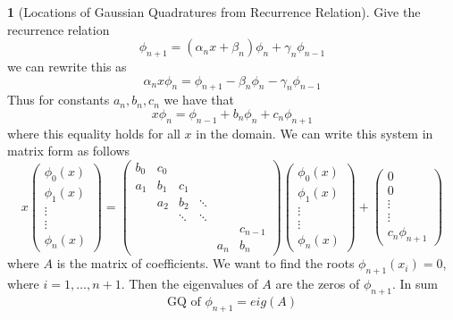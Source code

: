 \documentclass[12pt]{article}
\theoremstyle{definition}
\newtheorem{theorem}{\color{ForestGreen}{\textbf{Theorem}}}
\theoremstyle{definition}
\begin{document}
\begin{theorem}[Locations of Gaussian Quadratures from Recurrence Relation]
Give the recurrence relation 
\begin{equation}
	\phi_{n+1} = (\alpha_n x + \beta_n)\phi_n + \gamma_n \phi_{n-1}
\end{equation}
we can rewrite this as
\begin{equation}
	\alpha_n x \phi_n = \phi_{n+1} - \beta_n \phi_n - \gamma_n \phi_{n-1}
\end{equation}
Thus for constants $a_n,b_n,c_n$ we have that
\begin{equation}
	x \phi_n = \phi_{n-1} +  b_n \phi_n + c_n \phi_{n+1}
\end{equation}
where this equality holds for all $x$ in the domain. We can write this system in matrix form as follows
\begin{equation}
	x
	\begin{pmatrix}
	\phi_0(x) \\ \phi_1(x) \\ \vdots \\ \vdots \\ \phi_n(x)
	\end{pmatrix}
	=
	\begin{pmatrix}
	b_0 & c_0 \\
	a_1 & b_1 & c_1 \\
	& a_2 & b_2 & \ddots \\
	& & \ddots & \ddots \\
	& & & & & c_{n-1} \\
	& & & & a_n & b_n
	\end{pmatrix}
	\begin{pmatrix}
	\phi_0(x) \\ \phi_1(x) \\ \vdots \\ \vdots \\ \phi_n(x)
	\end{pmatrix}
	+
	\begin{pmatrix}
	0 \\ 0 \\ \vdots \\ \vdots \\ c_n \phi_{n+1}
	\end{pmatrix}
\end{equation}
where $A$ is the matrix of coefficients. We want to find the roots $\phi_{n+1}(x_i) = 0$, where $i=1,\ldots,n+1$. Then the eigenvalues of $A$ are the zeros of $\phi_{n+1}$. In sum
\begin{equation}
	\text{GQ of } \phi_{n+1} = eig(A)
\end{equation}
\end{theorem}
\end{document}
